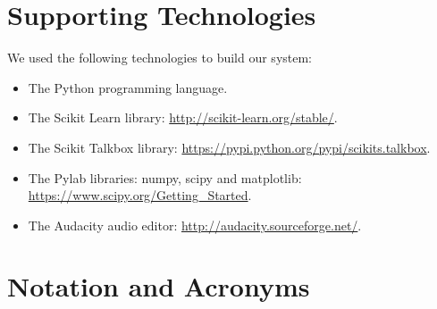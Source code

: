 \documentclass[ %
                    author={Sam Phippen},
                supervisor={Dr. Rafal Bogacz},
                     title={Real time voice activity detectors in noisy personal computing environments},
                  subtitle={},
                    degree={MEng},
                      year={2012} ]{thesis}
\begin{document}

\chapter*{Supporting Technologies}

We used the following technologies to build our system:

\begin{itemize}

    \item The Python programming language.

    \item The Scikit Learn library: \url{http://scikit-learn.org/stable/}.

    \item The Scikit Talkbox library:
        \url{https://pypi.python.org/pypi/scikits.talkbox}.

    \item The Pylab libraries: numpy, scipy and matplotlib:
        \url{https://www.scipy.org/Getting_Started}.

    \item The Audacity audio editor: \url{http://audacity.sourceforge.net/}.

\end{itemize}


\chapter*{Notation and Acronyms}

\vspace{1cm}

\noindent
\end{document}
